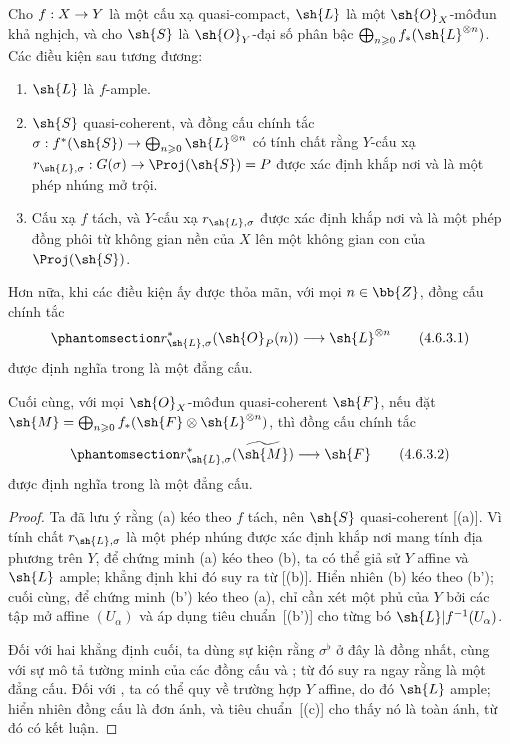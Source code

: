 \documentclass[oneside,10pt]{amsart}
\makeatletter
\renewcommand{\geq}{\geqslant}
\newcommand{\ega@arrow}[2]{\mathchoice{#1}{#2}{#2}{#2}}
\renewcommand{\to}{\ega@arrow{\longrightarrow}{\rightarrow}}
\newcommand{\oldpage}[2][]{\marginnote{\normalfont\footnotesize\textbf{#1}~|~#2}\ignorespaces}
\let\EGAOriginalLabel\label
\renewcommand{\label}[1]{\phantomsection\EGAOriginalLabel{#1}}
\makeatother
\begin{document}
\begin{proposition}[4.6.3]
\label{II.4.6.3}
Cho $f:X\to Y$ là một cấu xạ quasi-compact, $\sh{L}$ là một $\sh{O}_X$-môđun khả nghịch, và cho $\sh{S}$ là $\sh{O}_Y$-đại số phân bậc $\bigoplus_{n\geq0}f_*(\sh{L}^{\otimes n})$.
Các điều kiện sau tương đương:
\begin{enumerate}
  \item[\rm{(a)}] $\sh{L}$ là $f$-ample.
  \item[\rm{(b)}] $\sh{S}$ quasi-coherent, và đồng cấu chính tắc $\sigma:f^*(\sh{S})\to\bigoplus_{n\geq0}\sh{L}^{\otimes n}$  có tính chất rằng $Y$-cấu xạ $r_{\sh{L},\sigma}:G(\sigma)\to\Proj(\sh{S})=P$ được xác định khắp nơi và là một phép nhúng mở trội.
  \item[\rm{(b')}] Cấu xạ $f$ tách, và $Y$-cấu xạ $r_{\sh{L},\sigma}$ được xác định khắp nơi và là một phép đồng phôi từ không gian nền của $X$ lên một không gian con của $\Proj(\sh{S})$.
\end{enumerate}

Hơn nữa, khi các điều kiện ấy được thỏa mãn, với mọi $n\in\bb{Z}$, đồng cấu chính tắc
\[
\label{II.4.6.3.1}
  r_{\sh{L},\sigma}^*(\sh{O}_P(n))\to\sh{L}^{\otimes n}
\tag{4.6.3.1}
\]
được định nghĩa trong  là một đẳng cấu.

Cuối cùng, với mọi $\sh{O}_X$-môđun quasi-coherent $\sh{F}$, nếu đặt $\sh{M}=\bigoplus_{n\geq0}f_*(\sh{F}\otimes\sh{L}^{\otimes n})$, thì đồng cấu chính tắc
\[
\label{II.4.6.3.2}
  r_{\sh{L},\sigma}^*(\widetilde{\sh{M}})\to\sh{F}
\tag{4.6.3.2}
\]
được định nghĩa trong  là một đẳng cấu.
\end{proposition}

\begin{proof}
Ta đã lưu ý rằng (a) kéo theo $f$ tách, nên $\sh{S}$ quasi-coherent [(a)].
Vì tính chất $r_{\sh{L},\sigma}$ là một phép nhúng được xác định khắp nơi mang tính địa phương trên $Y$, để chứng minh (a) kéo theo (b), ta có thể giả sử $Y$ affine và $\sh{L}$ ample;
\oldpage[II]{90}
khẳng định khi đó suy ra từ [(b)].
Hiển nhiên (b) kéo theo (b');
cuối cùng, để chứng minh (b') kéo theo (a), chỉ cần xét một phủ của $Y$ bởi các tập mở affine $(U_\alpha)$ và áp dụng tiêu chuẩn~[(b')] cho từng bó $\sh{L}|f^{-1}(U_\alpha)$.

Đối với hai khẳng định cuối, ta dùng sự kiện rằng $\sigma^\flat$ ở đây là đồng nhất, cùng với sự mô tả tường minh của các đồng cấu  và ;
từ đó suy ra ngay rằng  là một đẳng cấu.
Đối với , ta có thể quy về trường hợp $Y$ affine, do đó $\sh{L}$ ample;
hiển nhiên đồng cấu  là đơn ánh, và tiêu chuẩn~[(c)] cho thấy nó là toàn ánh, từ đó có kết luận.
\end{proof}
\end{document}
